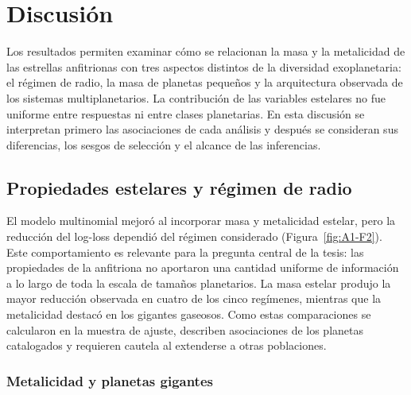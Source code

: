 
\chapter{Discusión}
\label{cap:discusion}

Los resultados permiten examinar cómo se relacionan la masa y la metalicidad de las estrellas anfitrionas con tres aspectos distintos de la diversidad exoplanetaria: el régimen de radio, la masa de planetas pequeños y la arquitectura observada de los sistemas multiplanetarios. La contribución de las variables estelares no fue uniforme entre respuestas ni entre clases planetarias. En esta discusión se interpretan primero las asociaciones de cada análisis y después se consideran sus diferencias, los sesgos de selección y el alcance de las inferencias.

\section{Propiedades estelares y régimen de radio}
\label{sec:dis-regimenes}

El modelo multinomial mejoró al incorporar masa y metalicidad estelar, pero la reducción del log-loss dependió del régimen considerado (Figura~\ref{fig:A1-F2}). Este comportamiento es relevante para la pregunta central de la tesis: las propiedades de la anfitriona no aportaron una cantidad uniforme de información a lo largo de toda la escala de tamaños planetarios. La masa estelar produjo la mayor reducción observada en cuatro de los cinco regímenes, mientras que la metalicidad destacó en los gigantes gaseosos. Como estas comparaciones se calcularon en la muestra de ajuste, describen asociaciones de los planetas catalogados y requieren cautela al extenderse a otras poblaciones.

\subsection{Metalicidad y planetas gigantes}
\label{sec:dis-metalicidad-gigantes}

